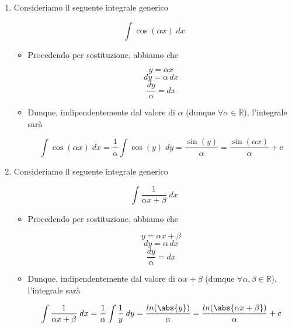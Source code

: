\documentclass[a4paper, 12pt]{report}
\begin{document}
\begin{enumerate}
\begin{itemize}
            \[ \int \sin(\alpha x) \; dx = \frac{1}{\alpha} \int \sin(y) \; dy = -\frac{\cos(y)}{\alpha} = -\frac{\cos(\alpha x)}{\alpha}+c\]
            
        \end{itemize}
        
        \newpage
        
        \item Consideriamo il seguente integrale generico
        
        \[ \int \cos(\alpha x) \; dx\]
        
        \begin{itemize}
            \item Procedendo per sostituzione, abbiamo che
            
            \[ y = \alpha x\]
            \[ dy = \alpha \, dx \]
            \[ \frac{dy}{\alpha} = dx \]
            
            \item Dunque, indipendentemente dal valore di $\alpha$ (dunque $\forall \alpha \in \mathbb{R}$), l'integrale sarà
            
            \[ \int \cos(\alpha x) \; dx = \frac{1}{\alpha} \int \cos(y) \; dy = \frac{\sin(y)}{\alpha} = \frac{\sin(\alpha x)}{\alpha}+c\]
            
        \end{itemize}
        
        \quad
        
        \quad
        
        \item Consideriamo il seguente integrale generico
        
        \[ \int \frac{1}{\alpha x + \beta} \; dx\]
        
        \begin{itemize}
            \item Procedendo per sostituzione, abbiamo che
            
            \[ y = \alpha x + \beta\]
            \[ dy = \alpha \, dx \]
            \[ \frac{dy}{\alpha} = dx \]
            
            \item Dunque, indipendentemente dal valore di $\alpha x + \beta$ (dunque $\forall \alpha, \beta \in \mathbb{R}$), l'integrale sarà
            
            \[ \int \frac{1}{\alpha x + \beta} \; dx = \frac{1}{\alpha} \int \frac{1}{y} \; dy = \frac{ln(\abs{y})}{\alpha} = \frac{ln(\abs{\alpha x + \beta})}{\alpha}+c\]
            

\end{itemize}
\end{enumerate}
\end{document}

